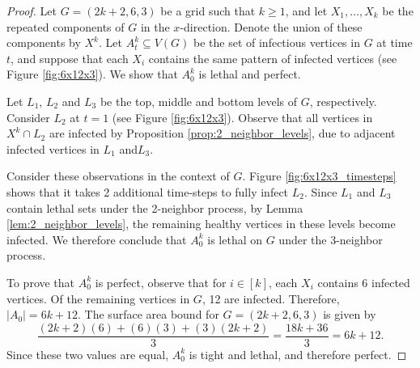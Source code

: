 \begin{proof}
Let $G=(2k+2,6,3)$ be a grid such that $k \geq 1$, and let $X_1, \dots, X_{k}$ be the repeated components of $G$ in the $x$-direction. Denote the union of these components by $X^k$. Let $A_t^k \subseteq V(G)$ be the set of infectious vertices in $G$ at time $t$, and suppose that each $X_i$ contains the same pattern of infected vertices (see Figure \ref{fig:6x12x3}). We show that $A_0^k$ is lethal and perfect. 

Let $L_1$, $L_2$ and $L_3$ be the top, middle and bottom levels of $G$, respectively. Consider $L_2$ at $t=1$ (see Figure \ref{fig:6x12x3}). Observe that all vertices in $X^k \cap L_2$ are infected by Proposition \ref{prop:2_neighbor_levels}, due to adjacent infected vertices in $L_1$ and$L_3$. 

Consider these observations in the context of $G$. Figure \ref{fig:6x12x3_timesteps} shows that it takes 2 additional time-steps to fully infect $L_2$. Since $L_1$ and $L_3$ contain lethal sets under the 2-neighbor process, by Lemma \ref{lem:2_neighbor_levels}, the remaining healthy vertices in these levels become infected. We therefore conclude that $A_0^k$ is lethal on $G$ under the 3-neighbor process.

To prove that $A_0^k$ is perfect, observe that for $i \in [k]$, each $X_i$ contains 6 infected vertices. Of the remaining vertices in $G$, 12 are infected. Therefore, $|A_0| = 6k+12$. The surface area bound for $G=(2k+2,6,3)$ is given by
$$\frac{(2k+2)(6) + (6)(3) + (3)(2k+2)}{3} = \frac{18k + 36}{3} = 6k+12.$$
Since these two values are equal, $A_0^k$ is tight and lethal, and therefore perfect.
\end{proof}

